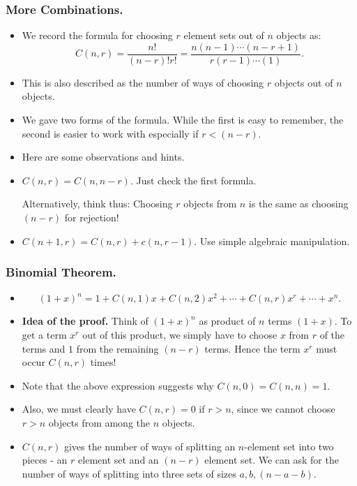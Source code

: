 %


\begin{frame}%
  \frametitle{More Combinations.}
  \begin{itemize}%
\item We record the formula for choosing $r$ element sets out of $n$
objects as:
$$C(n,r) = \frac{n!}{(n-r)!r!} =
\frac{n(n-1)\cdots (n-r+1)}{r(r-1)\cdots (1)}.$$

\item This is also described as the number of ways of choosing $r$
objects out of $n$ objects.

\item We gave two forms of the formula. While the first is easy to
remember, the second is easier to work with especially if $r<(n-r)$.

\item Here are some observations and hints.

\item $C(n,r)=C(n,n-r)$. Just check the first formula.

Alternatively, think thus: Choosing $r$ objects from $n$ is the same as
choosing $(n-r)$ for rejection!

\item $C(n+1,r) = C(n,r)+c(n,r-1)$. Use simple algebraic manipulation.


\end{itemize}
\end{frame}
%

\begin{frame}%
  \frametitle{Binomial Theorem.}
  \begin{itemize}%
\item {}
$$(1+x)^n = 1 + C(n,1)x+C(n,2)x^2+\cdots +C(n,r)x^r+\cdots +x^n.$$
\item {\bf Idea of the proof.} Think of $(1+x)^n$ as product of $n$
terms $(1+x)$. To get a term $x^r$ out of this product, we simply have
to choose $x$ from $r$ of the terms and $1$ from the remaining $(n-r)$
terms. Hence the term $x^r$ must occur $C(n,r)$ times!

\item Note that the above expression suggests why $C(n,0)=C(n,n)=1$.

\item Also, we must clearly have $C(n,r)=0$ if $r>n$, since we cannot
choose $r>n$ objects from among the $n$ objects.

\item $C(n,r)$ gives the number of ways of splitting an $n$-element set
into two pieces - an $r$ element set and an $(n-r)$ element set. We can
ask for the number of ways of splitting into three sets of sizes
$a,b,(n-a-b)$. 


\end{itemize}
\end{frame}
%


